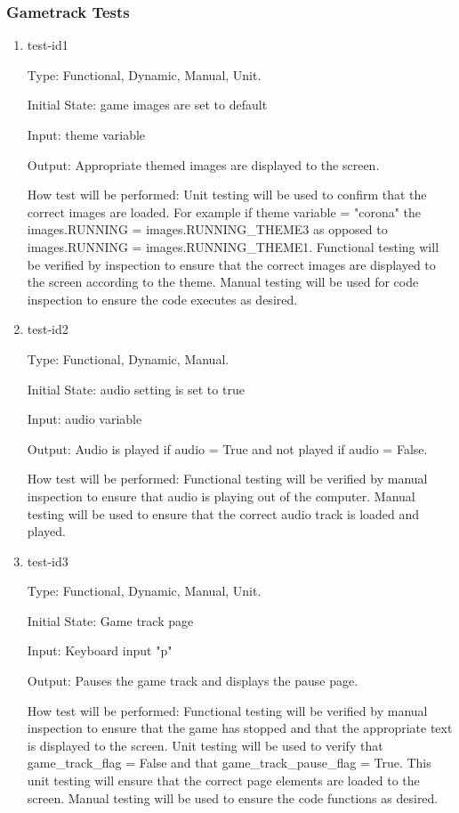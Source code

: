 \documentclass[12pt, titlepage]{article}
\begin{document}
\subsubsection{Gametrack Tests}

\begin{enumerate}
	
	\item{test-id1\\}
	
	Type: Functional, Dynamic, Manual, Unit.
	
	Initial State: game images are set to default 
	
	Input: theme variable
	
	Output: Appropriate themed images are displayed to the screen.
	
	How test will be performed: Unit testing will be used to confirm that the correct images are loaded. For example if theme variable = "corona" the images.RUNNING = images.RUNNING\_THEME3 as opposed to images.RUNNING = images.RUNNING\_THEME1. Functional testing will be verified by inspection to ensure that the correct images are displayed to the screen according to the theme. Manual testing will be used for code inspection to ensure the code executes as desired. 
	
	\item{test-id2\\}
	
	Type: Functional, Dynamic, Manual.
	
	Initial State: audio setting is set to true 
	
	Input: audio variable 
	
	Output: Audio is played if audio = True and not played if audio = False. 
	
	How test will be performed: Functional testing will be verified by manual inspection to ensure that audio is playing out of the computer. Manual testing will be used to ensure that the correct audio track is loaded and played. 
	
	\item{test-id3\\}
	
	Type: Functional, Dynamic, Manual, Unit.
	
	Initial State: Game track page 
	
	Input: Keyboard input "p" 
	
	Output: Pauses the game track and displays the pause page. 
	
	How test will be performed: Functional testing will be verified by manual inspection to ensure that the game has stopped and that the appropriate text is displayed to the screen. Unit testing will be used to verify that game\_track\_flag = False and that game\_track\_pause\_flag = True. This unit testing will ensure that the correct page elements are loaded to the screen. Manual testing will be used to ensure the code functions as desired. 
	

\end{enumerate}
\end{document}
